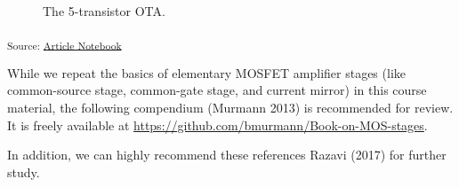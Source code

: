 \documentclass[
  a4paper,
  DIV=11,
  numbers=noendperiod]{scrartcl}
\begin{document}
\begin{figure}[H]


\caption{\label{fig-basic-ota}The 5-transistor OTA.}

\end{figure}%

\textsubscript{Source:
\href{https://iic-jku.github.io/analog-circuit-design/index.qmd.html}{Article
Notebook}}

\begin{tcolorbox}[enhanced jigsaw, titlerule=0mm, left=2mm, coltitle=black, toprule=.15mm, breakable, opacitybacktitle=0.6, colframe=quarto-callout-warning-color-frame, bottomtitle=1mm, toptitle=1mm, opacityback=0, colbacktitle=quarto-callout-warning-color!10!white, title=\textcolor{quarto-callout-warning-color}{\faExclamationTriangle}\hspace{0.5em}{Refresh MOSFET Basic Circuits}, arc=.35mm, rightrule=.15mm, colback=white, bottomrule=.15mm, leftrule=.75mm]

While we repeat the basics of elementary MOSFET amplifier stages (like
common-source stage, common-gate stage, and current mirror) in this
course material, the following compendium (Murmann 2013) is recommended
for review. It is freely available at
\url{https://github.com/bmurmann/Book-on-MOS-stages}.

In addition, we can highly recommend these references Razavi (2017) for
further study.

\end{tcolorbox}
\end{document}
